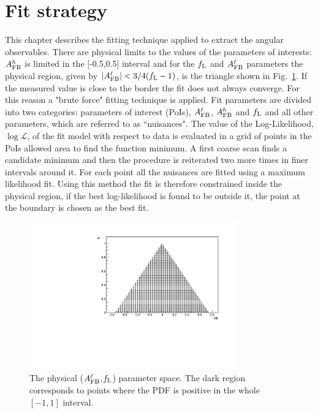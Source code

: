 \section{Fit strategy}

This chapter describes the fitting technique applied to extract the angular observables.
There are physical limits to the values of the parameters of interests:
$A_{\rm FB}^h$ is limited in the [-0.5,0.5] interval and for the $f_{\rm L}$ and 
$A_{\rm FB}^\ell$ parameters the physical region, given by $|A_{\rm FB}^\ell| < 3/4(f_{\rm L}-1)$,
is the triangle shown in Fig.~\ref{fig:pdfscan}.
If the measured value is close to the border the fit does not always converge. For this reason
a "brute force" fitting technique is applied. Fit parameters are
divided into two categories: parameters of interest (PoIs), $A_{\rm FB}^\ell$,
$A_{\rm FB}^h$ and $f_{\rm L}$ and all other parameters, which are referred to as ``nuisances".
The value of the Log-Likelihood, $\log\mathcal{L}$, of the fit model with respect to data 
is evaluated in a grid of points in the PoIs allowed area to find the function minimum.
A first coarse scan finds a candidate minimum and then the procedure is reiterated two
more times in finer intervals around it. For each point all the nuisances are fitted
using a maximum likelihood fit. Using this method the fit is therefore constrained inside the physical
region, if the best log-likelihood is found to be outside it, the point at the boundary
is chosen as the best fit. %

\begin{figure}[h!]
\centering
\includegraphics[width=0.8\textwidth]{Lmumu/figs/scan.pdf}
\caption{The physical ($A_{\rm FB}^\ell$,$f_{\rm L}$) parameter space. The dark region corresponds 
to points where the PDF is positive in the whole $[-1,1]$ interval. }
\label{fig:pdfscan}
\end{figure}


